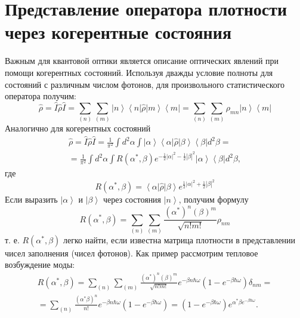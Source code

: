 \section{Представление оператора плотности через когерентные
  состояния}
Важным для квантовой оптики является описание оптических явлений при
помощи когерентных состояний. Используя дважды условие полноты для  
состояний с различным числом фотонов, для произвольного
статистического оператора получим: 
\[
\hat{\rho} = \hat{I}\hat{\rho}\hat{I} = 
\sum_{(n)}\sum_{(m)}
\left|n\right>\left<n\right|\hat{\rho}\left|m\right>\left<m\right| = 
\sum_{(n)}\sum_{(m)} \rho_{mn}\left|n\right>\left<m\right|
\]
Аналогично для когерентных состояний
\begin{eqnarray}
\hat{\rho} = \hat{I}\hat{\rho}\hat{I} = 
\frac{1}{\pi^2}\int d^2\alpha\int
\left|\alpha\right>\left<\alpha\right|\hat{\rho}\left|\beta\right>\left<\beta\right|
d^2 \beta = 
\nonumber \\
= \frac{1}{\pi^2} \int d^2\alpha \int
R\left(\alpha^{*}, \beta\right) e^{-\frac{1}{2}\left|\alpha\right|^2 -\frac{1}{2}\left|\beta\right|^2}
\left|\alpha\right>\left<\beta\right|d^2 \beta ,
\end{eqnarray}
где
\[
R\left(\alpha^{*}, \beta\right) =
\left<\alpha\right|\hat{\rho}\left|\beta\right>
e^{\frac{1}{2}\left|\alpha\right|^2 +\frac{1}{2}\left|\beta\right|^2}
\]
Если выразить $\left|\alpha\right>$ и $\left|\beta\right>$ через
состояния $\left|n\right>$,  получим формулу 
\begin{equation}
R\left(\alpha^{*}, \beta\right) = \sum_{(n)}\sum_{(m)}
\frac{\left(\alpha^{*}\right)^n \left(\beta\right)^m}{\sqrt{n!m!}}\rho_{nm}
\end{equation}
т. е. $R\left(\alpha^{*}, \beta\right)$ легко найти, если известна
матрица плотности в представлении чисел заполнения (чисел
фотонов). Как пример рассмотрим тепловое возбуждение моды: 
\begin{eqnarray}
R\left(\alpha^{*}, \beta\right) = \sum_{(n)}\sum_{(m)}
\frac{\left(\alpha^{*}\right)^n \left(\beta\right)^m}{\sqrt{n!m!}}
e^{-\beta n \hbar \omega}\left(1  -  e^{-\beta \hbar \omega}\right)
\delta_{nm} = 
\nonumber \\
= \sum_{(n)}\frac{\left(\alpha^{*} \beta\right)^n }{n!}
e^{-\beta n \hbar \omega}\left(1  -  e^{-\beta \hbar \omega}\right) =
\left(1  -  e^{-\beta \hbar \omega}\right) e^{\alpha^{*}\beta
  e^{-\beta \hbar \omega}}.
\end{eqnarray}

